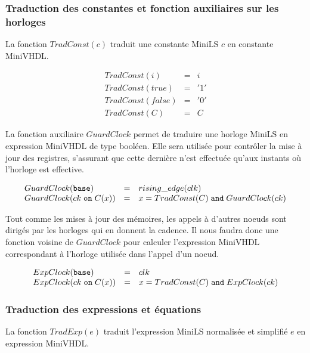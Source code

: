 \documentclass[a4paper]{article}
\newcommand{\mybox}[1]{\mbox{\tt{#1}}}
\newcommand{\Base}[0]{\mybox{base}}
\newcommand{\On}[3]{#1 \; \mybox{on} \; #2 (#3)}
\begin{document}
\subsubsection{Traduction des constantes et fonction auxiliaires sur les horloges}

La fonction $TradConst(c)$ traduit une constante MiniLS $c$ en constante
MiniVHDL.

\newcommand{\TradC}[1]{TradConst(#1)}

\[
\begin{array}{lcl}
  \TradC{i} & = & i \\
  \TradC{true} & = & '1' \\
  \TradC{false} & = & '0' \\
  \TradC{C} & = & C
\end{array}
\]

La fonction auxiliaire $GuardClock$ permet de traduire une horloge MiniLS en
expression MiniVHDL de type bool\'een. Elle sera utilis\'ee pour contr\^oler la
mise \`a jour des registres, s'assurant que cette derni\`ere n'est effectu\'ee
qu'aux instants o\`u l'horloge est effective.

\newcommand{\GEC}[1]{GuardClock(#1)}

\[
\begin{array}{lcl}
  \GEC{\Base} & = & rising\_edge(clk) \\
  \GEC{\On{ck}{C}{x}} & = & x = \TradC{C} \; \mathtt{and} \; \GEC{ck}
\end{array}
\]

Tout comme les mises \`a jour des m\'emoires, les appels \`a d'autres noeuds
sont dirig\'es par les horloges qui en donnent la cadence. Il nous faudra donc
une fonction voisine de $GuardClock$ pour calculer l'expression MiniVHDL
correspondant \`a l'horloge utilis\'ee dans l'appel d'un noeud.

\newcommand{\EC}[1]{ExpClock(#1)}

\[
\begin{array}{lcl}
  \EC{\Base} & = & clk \\
  \EC{\On{ck}{C}{x}} & = & x = \TradC{C} \; \mathtt{and} \; \EC{ck}
\end{array}
\]

\subsubsection{Traduction des expressions et \'equations}

La fonction $TradExp(e)$ traduit l'expression MiniLS normalis\'ee et
simplifi\'e $e$ en expression MiniVHDL.
\end{document}
